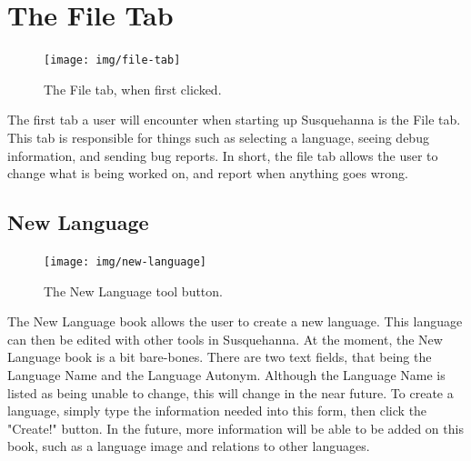 \documentclass{report}
\begin{document}
	\chapter{The File Tab}
	\begin{figure}[ht]
		\centering
		\texttt{[image: img/file-tab]}
		\caption{The File tab, when first clicked.}
		\label{fig:file-tab}
	\end{figure}
	The first tab a user will encounter when starting up Susquehanna is the File tab. This tab is responsible for things such as selecting a language, seeing debug information, and sending bug reports. In short, the file tab allows the user to change what is being worked on, and report when anything goes wrong.
	\newpage
	\section{New Language}
	\begin{figure}
		\centering
		\texttt{[image: img/new-language]}
		\caption{The New Language tool button.}
		\label{fig:new-language}
	\end{figure}
	The New Language book allows the user to create a new language. This language can then be edited with other tools in Susquehanna. At the moment, the New Language book is a bit bare-bones. There are two text fields, that being the Language Name and the Language Autonym. Although the Language Name is listed as being unable to change, this will change in the near future. To create a language, simply type the information needed into this form, then click the "Create!" button. In the future, more information will be able to be added on this book, such as a language image and relations to other languages.
\end{document}
